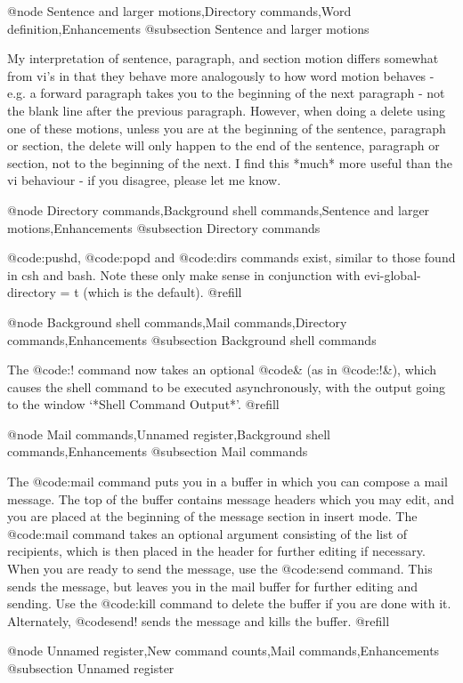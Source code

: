{@node Sentence and larger motions,Directory commands,Word definition,Enhancements
@subsection Sentence and larger motions

My interpretation of sentence, paragraph, and section motion differs
somewhat from vi's in that they behave more analogously to how word
motion behaves - e.g. a forward paragraph takes you to the beginning of
the next paragraph - not the blank line after the previous paragraph.
However, when doing a delete using one of these motions, unless you are
at the beginning of the sentence, paragraph or section, the delete will
only happen to the end of the sentence, paragraph or section, not to the
beginning of the next.  I find this *much* more useful than the vi
behaviour - if you disagree, please let me know.

@node Directory commands,Background shell commands,Sentence and larger motions,Enhancements
@subsection Directory commands

@code{:pushd}, @code{:popd} and @code{:dirs} commands exist,
similar to those found in
csh and bash.  Note these only make sense in conjunction with
evi-global-directory = t (which is the default). @refill

@node Background shell commands,Mail commands,Directory commands,Enhancements
@subsection Background shell commands

The @code{:!} command now takes an optional @code{&} (as in @code{:!&}),
which causes
the shell command to be executed asynchronously, with the output going
to the window `*Shell Command Output*'. @refill

@node Mail commands,Unnamed register,Background shell commands,Enhancements
@subsection Mail commands

The @code{:mail} command puts you in a buffer in which you can compose
a mail message.  The top of the buffer contains message headers which you
may edit, and you are placed at the beginning of the message section in
insert mode.  The @code{:mail} command takes an optional argument consisting
of the list of recipients, which is then placed in the header for further
editing if necessary.  When you are ready to send the message, use the
@code{:send} command.  This sends the message, but leaves you in the mail
buffer for further editing and sending.  Use the @code{:kill} command to
delete the buffer if you are done with it.  Alternately, @code{send!} sends
the message and kills the buffer. @refill

@node Unnamed register,New command counts,Mail commands,Enhancements
@subsection Unnamed register

}
